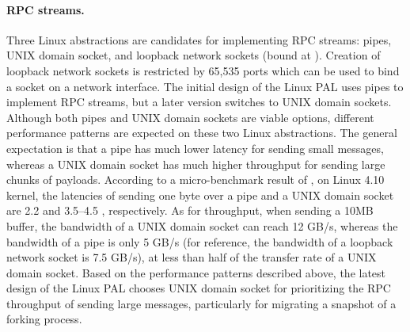 \paragraph{RPC streams.}
Three Linux abstractions are candidates for implementing RPC streams: pipes, UNIX domain socket, and loopback network sockets (bound at ).
Creation of loopback network sockets
is restricted by 65,535 ports which can be used to bind a socket on a network interface. %
The initial design of the Linux PAL uses pipes to implement RPC streams,
but a later version switches to UNIX domain sockets.
Although both pipes and UNIX domain sockets are viable options,
different performance patterns are expected on these two Linux abstractions.
The general expectation is that a pipe has much lower latency for sending small messages, whereas a UNIX domain socket has much higher throughput for sending large chunks of payloads.
According to a micro-benchmark result of \lmbench{}, on Linux 4.10 kernel,
the latencies of sending one byte over a pipe and a UNIX domain socket are \roughly{}2.2 \us{} and \roughly{}3.5--4.5 \us{}, respectively.
As for throughput, when sending a 10MB buffer, the bandwidth of a UNIX domain socket can reach \roughly{}12 GB/s, whereas the bandwidth of a pipe is only \roughly{}5 GB/s (for reference, the bandwidth of a loopback network socket is \roughly{}7.5 GB/s), at less than half of the transfer rate of a UNIX domain socket.
Based on the performance patterns described above, the latest design of the Linux PAL chooses UNIX domain socket
for prioritizing the RPC throughput of sending large messages, particularly for migrating a snapshot of a forking process.





